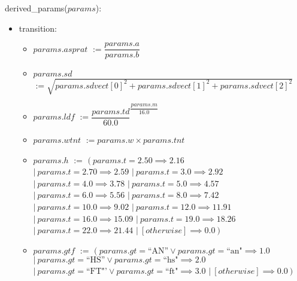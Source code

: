 \documentclass[12pt,fleqn]{article}
\begin{document}
derived\_params($params$):
\begin{itemize}
\item transition: \begin{itemize}
                        \item[] $params.asprat$ \tabto{3cm} $:= \dfrac{params.a}{params.b}$\\
                        \item[] $params.sd$ \tabto{3cm} $ := \sqrt{params.sdvect[0]^2 + params.sdvect[1]^2 + params.sdvect[2]^2}$\\
                        \item[] $params.ldf$ \tabto{3cm} $ := \dfrac{params.td}{60.0}^{\dfrac{params.m}{16.0}}$\\
                        \item[] $params.wtnt$ \tabto{3cm} $ := params.w \times params.tnt$\\
                        \item[] $params.h$ \tabto{3cm} $ := $ \tabto{3.6cm} $ (~params.t = 2.50 \implies 2.16$\\
                                                     \tabto{3.6cm} $ |~params.t = 2.70 \implies 2.59$
						     \tabto{3.6cm} $ |~params.t = 3.0 \implies 2.92$
						     \tabto{3.6cm} $ |~params.t = 4.0 \implies 3.78$
						     \tabto{3.6cm} $ |~params.t = 5.0 \implies 4.57$
						     \tabto{3.6cm} $ |~params.t = 6.0 \implies 5.56$
						     \tabto{3.6cm} $ |~params.t = 8.0 \implies 7.42$
						     \tabto{3.6cm} $ |~params.t = 10.0 \implies 9.02$
						     \tabto{3.6cm} $ |~params.t = 12.0 \implies 11.91$
						     \tabto{3.6cm} $ |~params.t = 16.0 \implies 15.09$
						     \tabto{3.6cm} $ |~params.t = 19.0 \implies 18.26$
						     \tabto{3.6cm} $ |~params.t = 22.0 \implies 21.44$
                                                     \tabto{3.6cm} $ |~[ otherwise ] \implies 0.0~)$\\
                        \item[] $params.gtf$ \tabto{3cm} $ := $ \tabto{3.6cm} $ (~params.gt = \textrm{``AN''} \vee params.gt = \textrm{``an"} \implies 1.0$
                                                                                    \tabto{3.6cm} $ |~params.gt = \textrm{``HS''} \vee params.gt = \textrm{``hs"} \implies 2.0$
                                                                                    \tabto{3.6cm} $ |~params.gt = \textrm{``FT"'} \vee params.gt = \textrm{``ft"} \implies 3.0$
                                                                                    \tabto{3.6cm} $ |~[otherwise] \implies 0.0~)$
                        

\end{itemize}
\end{itemize}
\end{document}
